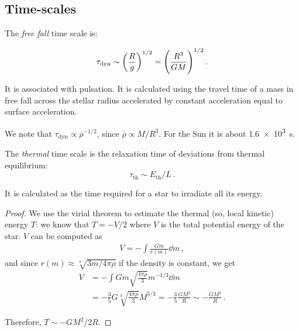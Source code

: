 \documentclass[main.tex]{subfiles}
\begin{document}




\subsection{Time-scales}

The \emph{free fall} time scale is:

\begin{equation}
  \tau_{\text{dyn}} \sim \qty(\frac{R}{g} )^{1/2} = \qty(\frac{R^3}{GM} )^{1/2}\,.
\end{equation}

It is associated with pulsation. It is calculated using the travel time of a mass in free fall across the stellar radius accelerated by constant acceleration equal to surface acceleration.

We note that \(\tau_{\text{dyn}} \propto \overline{\rho} ^{-1/2} \), since \(\overline{\rho} \propto M / R^3\). For the Sun it is about \SI{1.6e3}{s}.

The \emph{thermal} time scale is the relaxation time of deviations from thermal equilibrium:
%
\begin{equation}
  \tau_{\text{th}} \sim E_{\text{th}} / L\,.
\end{equation}

It is calculated as the time required for a star to irradiate all its energy. 

\begin{proof}
We use the virial theorem to estimate the thermal (so, local kinetic) energy \(T\): we know that \(T = - V/2\) where \(V\) is the total potential energy of the star. \(V\) can be computed as 
%
\begin{align}
V = - \int \frac{Gm}{r(m)} \dd{m}
\,,
\end{align}
%
and since \(r(m) \approx \sqrt[3]{3m / 4 \pi \rho }\) if the density is constant, we get 
%
\begin{align}
V &= - \int Gm \sqrt{\frac{4 \pi \rho }{3}} m^{-1/3} \dd{m}  \\
&=- \frac{3}{5} G \sqrt[3]{\frac{4 \pi \rho }{3}} M^{5/3} = -\frac{3}{5} \frac{GM^2}{R} \sim - \frac{GM^2}{R}
\,.
\end{align}

Therefore, \(T \sim - GM^2 / 2 R\).  
\end{proof}
\end{document}
